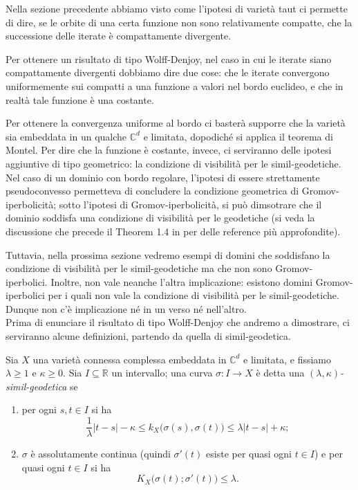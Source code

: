 Nella sezione precedente abbiamo visto come l'ipotesi di varietà taut ci permette di dire, se le orbite di una certa funzione non sono relativamente compatte, che la successione delle iterate è compattamente divergente.

Per ottenere un risultato di tipo Wolff-Denjoy, nel caso in cui le iterate siano compattamente divergenti dobbiamo dire due cose: che le iterate convergono uniformemente sui compatti a una funzione a valori nel bordo euclideo, e che in realtà tale funzione è una costante.

Per ottenere la convergenza uniforme al bordo ci basterà supporre che la varietà sia embeddata in un qualche $\mathbb{C}^d$ e limitata, dopodiché si applica il teorema di Montel. Per dire che la funzione è costante, invece, ci serviranno delle ipotesi aggiuntive di tipo geometrico: la condizione di visibilità per le simil-geodetiche. \\

Nel caso di un dominio con bordo regolare, l'ipotesi di essere strettamente pseudoconvesso permetteva di concludere la condizione geometrica di Gromov-iperbolicità; sotto l'ipotesi di Gromov-iperbolicità, si può dimsotrare che il dominio soddisfa una condizione di visibilità per le geodetiche (si veda la discussione che precede il Theorem 1.4 in \cite{BZ1} per delle reference più approfondite).

Tuttavia, nella prossima sezione vedremo esempi di domini che soddisfano la condizione di visibilità per le simil-geodetiche ma che non sono Gromov-iperbolici.
Inoltre, non vale neanche l'altra implicazione: esistono domini Gromov-iperbolici per i quali non vale la condizione di visibilità per le simil-geodetiche. Dunque non c'è implicazione né in un verso né nell'altro. \\

Prima di enunciare il risultato di tipo Wolff-Denjoy che andremo a dimostrare, ci serviranno alcune definizioni, partendo da quella di simil-geodetica.

\begin{defn}
    Sia $X$ una varietà connessa complessa embeddata in $\mathbb{C}^d$ e limitata, e fissiamo $\lambda \ge 1$ e $\kappa \ge 0$. Sia $I\subseteq \mathbb{R}$ un intervallo; una curva $\sigma:I \longrightarrow X$ è detta una \textit{$(\lambda,\kappa)$-simil-geodetica} se
    \begin{enumerate}
        \item per ogni $s,t \in I$ si ha
        $$\frac{1}{\lambda}|t-s|-\kappa \le k_X\big(\sigma(s),\sigma(t)\big)\le\lambda|t-s|+\kappa;$$
        \item $\sigma$ è assolutamente continua (quindi $\sigma'(t)$ esiste per quasi ogni $t \in I$) e per quasi ogni $t \in I$ si ha
        $$K_X\big(\sigma(t);\sigma'(t)\big) \le \lambda.$$
    \end{enumerate}
\end{defn}

